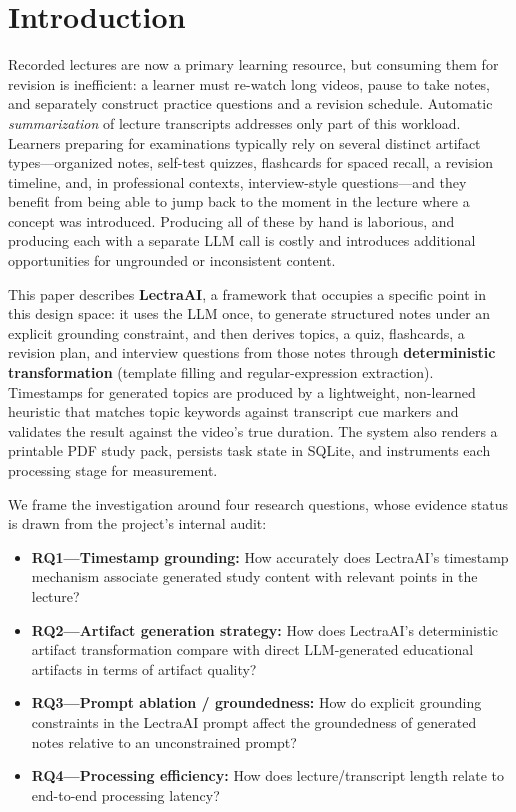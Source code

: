\documentclass[conference]{IEEEtran}
\begin{document}
\section{Introduction}
Recorded lectures are now a primary learning resource, but consuming them for revision is inefficient: a learner must re-watch long videos, pause to take notes, and separately construct practice questions and a revision schedule. Automatic \emph{summarization} of lecture transcripts addresses only part of this workload. Learners preparing for examinations typically rely on several distinct artifact types---organized notes, self-test quizzes, flashcards for spaced recall, a revision timeline, and, in professional contexts, interview-style questions---and they benefit from being able to jump back to the moment in the lecture where a concept was introduced. Producing all of these by hand is laborious, and producing each with a separate LLM call is costly and introduces additional opportunities for ungrounded or inconsistent content.

This paper describes \textbf{LectraAI}, a framework that occupies a specific point in this design space: it uses the LLM once, to generate structured notes under an explicit grounding constraint, and then derives topics, a quiz, flashcards, a revision plan, and interview questions from those notes through \textbf{deterministic transformation} (template filling and regular-expression extraction). Timestamps for generated topics are produced by a lightweight, non-learned heuristic that matches topic keywords against transcript cue markers and validates the result against the video's true duration. The system also renders a printable PDF study pack, persists task state in SQLite, and instruments each processing stage for measurement.

We frame the investigation around four research questions, whose evidence status is drawn from the project's internal audit:
\begin{itemize}
\item \textbf{RQ1---Timestamp grounding:} How accurately does LectraAI's timestamp mechanism associate generated study content with relevant points in the lecture?
\item \textbf{RQ2---Artifact generation strategy:} How does LectraAI's deterministic artifact transformation compare with direct LLM-generated educational artifacts in terms of artifact quality?
\item \textbf{RQ3---Prompt ablation / groundedness:} How do explicit grounding constraints in the LectraAI prompt affect the groundedness of generated notes relative to an unconstrained prompt?
\item \textbf{RQ4---Processing efficiency:} How does lecture/transcript length relate to end-to-end processing latency?
\end{itemize}
\end{document}

